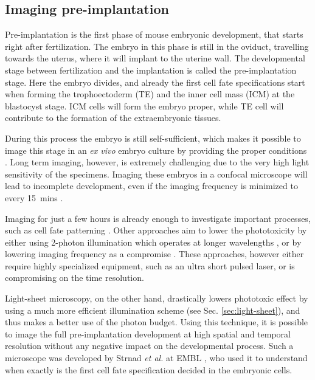   \subsection{Imaging pre-implantation}

    Pre-implantation is the first phase of mouse embryonic development, that starts right after fertilization. The embryo in this phase is still in the oviduct, travelling towards the uterus, where it will implant to the uterine wall. The developmental stage between fertilization and the implantation is called the pre-implantation stage. Here the embryo divides, and already the first cell fate specifications start when forming the trophoectoderm (TE) and the inner cell mass (ICM) at the blastocyst stage. ICM cells will form the embryo proper, while TE cell will contribute to the formation of the extraembryonic tissues.
    
    During this process the embryo is still self-sufficient, which makes it possible to image this stage in an \textit{ex vivo} embryo culture by providing the proper conditions \cite{doherty_culture_2000}. Long term imaging, however, is extremely challenging due to the very high light sensitivity of the specimens. Imaging these embryos in a confocal microscope will lead to incomplete development, even if the imaging frequency is minimized to every \SI{15}{mins} \cite{strnad_inverted_2016}.

    Imaging for just a few hours is already enough to investigate important processes, such as cell fate patterning \cite{dietrich_stochastic_2007}. Other approaches aim to lower the phototoxicity by either using 2-photon illumination which operates at longer wavelengths \cite{denk_two-photon_1990,squirrell_long-term_1999,mcdole_lineage_2011}, or by lowering imaging frequency as a compromise \cite{yamagata_long-term_2009}. These approaches, however either require highly specialized equipment, such as an ultra short pulsed laser, or is compromising on the time resolution.

    Light-sheet microscopy, on the other hand, drastically lowers phototoxic effect by using a much more efficient illumination scheme (see Sec. \ref{sec:light-sheet}), and thus makes a better use of the photon budget. Using this technique, it is possible to image the full pre-implantation development at high spatial and temporal resolution without any negative impact on the developmental process. Such a microscope was developed by Strnad \textit{et al.} at EMBL \cite{strnad_inverted_2016}, who used it to understand when exactly is the first cell fate specification decided in the embryonic cells.

